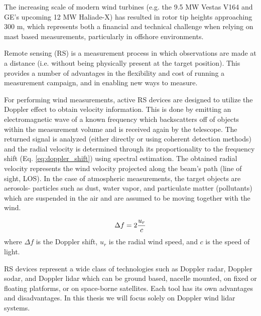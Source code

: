 The increasing scale of modern wind turbines (e.g. the 9.5 MW Vestas V164 and GE's upcoming 12 MW Haliade-X) has resulted in rotor tip heights approaching 300 m, which represents both a financial and technical challenge when relying on mast based measurements, particularly in offshore environments.

Remote sensing (RS) is a measurement process in which observations are made at a distance (i.e. without being physically present at the target position). This provides a number of advantages in the flexibility and cost of running a measurement campaign, and in enabling new ways to measure.

For performing wind measurements, active RS devices are designed to utilize the Doppler effect to obtain velocity information. This is done by emitting an electromagnetic wave of a known frequency which backscatters off of objects within the measurement volume and is received again by the telescope. The returned signal is analyzed (either directly or using coherent detection methods) and the radial velocity is determined through its proportionality to the frequency shift (Eq. \ref{eq:doppler_shift}) using spectral estimation. The obtained radial velocity represents the wind velocity projected along the beam's path (line of sight, LOS). In the case of atmospheric measurements, the target objects are aerosols- particles such as dust, water vapor, and particulate matter (pollutants) which are suspended in the air and are assumed to be moving together with the wind.

\begin{equation}
    \centering
        \Delta f=2 \frac{u_{r}}{c}
    \label{eq:doppler_shift}
\end{equation}
\noindent
where $\Delta f$ is the Doppler shift, $u_r$ is the radial wind speed, and $c$ is the speed of light.

RS devices represent a wide class of technologies such as Doppler radar, Doppler sodar, and Doppler lidar which can be ground based, nacelle mounted, on fixed or floating platforms, or on space-borne satellites. Each tool has its own advantages and disadvantages. In this thesis we will focus solely on Doppler wind lidar systems.

\clearpage
